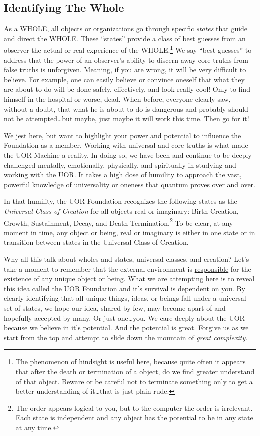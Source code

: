\documentclass[twocolumn,10pt]{article}
\begin{document}
\subsection*{Identifying The Whole}
As a WHOLE, all objects or organizations go through specific \textit{states} that guide and direct the WHOLE\@.
These ``states'' provide a class of best guesses from an observer the actual or real experience of the WHOLE\@.\footnote{The phenomenon of hindsight is useful here, because quite often it appears that after the death or termination of a object, do we find greater understand of that object.
Beware or be careful not to terminate something only to get a better understanding of it\ldots that is just plain rude.}
We say ``best guesses'' to address that the power of an observer's ability to discern away core truths from false truths is unforgiven.
Meaning, if you are wrong, it will be very difficult to believe.
For example, one can easily believe or convince oneself that what they are about to do will be done safely, effectively, and look really cool!
Only to find himself in the hospital or worse, dead.
When before, everyone clearly saw, without a doubt, that what he is about to do is dangerous and probably should not be attempted\ldots but maybe, just maybe it will work this time.
Then go for it!

We jest here, but want to highlight your power and potential to influence the Foundation as a member.
Working with universal and core truths is what made the UOR Machine a reality.
In doing so, we have been and continue to be deeply challenged mentally, emotionally, physically, and spiritually in studying and working with the UOR\@.
It takes a high dose of humility to approach the vast, powerful knowledge of universality or oneness that quantum proves over and over.

In that humility, the UOR Foundation recognizes the following states as the \textit{Universal Class of Creation} for all objects real or imaginary:
Birth-Creation, Growth, Sustainment, Decay, and Death-Termination.\footnote{The order appears logical to you, but to the computer the order is irrelevant. Each state is independent and any object has the potential to be in any state at any time.}
To be clear, at any moment in time, any object or being, real or imaginary is either in one state or in transition between states in the Universal Class of Creation.

Why all this talk about wholes and states, universal classes, and creation?
Let's take a moment to remember that the external environment is \underline{responsible} for the existence of any unique object or being.
What we are attempting here is to reveal this idea called the UOR Foundation and it's survival is dependent on you.
By clearly identifying that all unique things, ideas, or beings fall under a universal set of states, we hope our idea, shared by few, may become apart of and hopefully accepted by many.
Or just one\ldots you.
We care deeply about the UOR because we believe in it's potential.
And the potential is great.
Forgive us as we start from the top and attempt to slide down the mountain of \textit{great complexity}.
\end{document}
